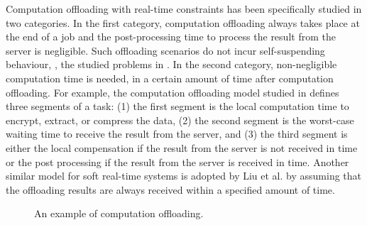 Computation offloading with real-time constraints has been specifically studied in two categories. In the first category, computation offloading always takes place at the end of a job and the post-processing time to process the result from the server is negligible. Such offloading scenarios do not incur self-suspending behaviour, \eg, the studied problems in \cite{nimmagadda2010real,DBLP:conf/ecrts/TomaC13}. In the second category, non-negligible computation time is needed, in a certain amount of time after computation offloading. For example, the computation offloading model studied in \cite{Liu_2014} defines three segments of a task: (1) the first segment is the local computation time to encrypt, extract, or compress the data, (2) the second segment is the worst-case waiting time to receive the result from the server, and (3) the third segment is either the local compensation if the result from the server is not received in time or the post processing if the result from the server is received in time. Another similar model for soft real-time systems is adopted by Liu et al. \cite{DBLP:conf/ecrts/LiuLZGH015} by assuming that the offloading results are always received within a specified amount of time.

\begin{figure}[t]
  \centering
{}
  \caption{An example of computation offloading.}
  \label{fig:offloading}
\end{figure}


